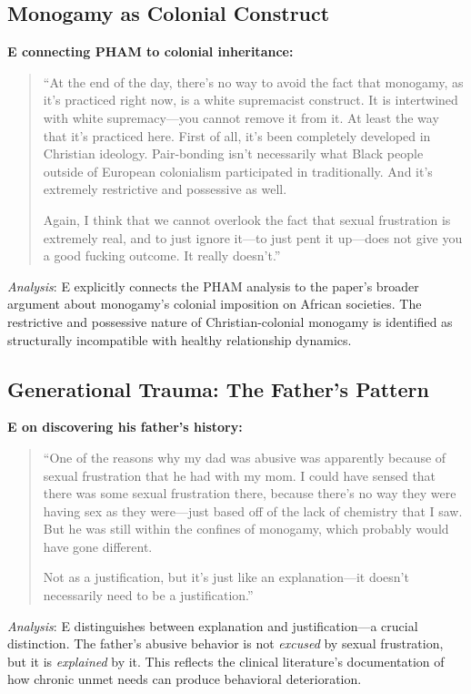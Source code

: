 \documentclass[12pt,openany]{book}
\numberwithin{equation}{chapter}
\begin{document}
\subsection{Monogamy as Colonial Construct}

\textbf{E connecting PHAM to colonial inheritance:}
\begin{quote}
``At the end of the day, there's no way to avoid the fact that monogamy, as it's practiced right now, is a white supremacist construct. It is intertwined with white supremacy---you cannot remove it from it. At least the way that it's practiced here. First of all, it's been completely developed in Christian ideology. Pair-bonding isn't necessarily what Black people outside of European colonialism participated in traditionally. And it's extremely restrictive and possessive as well.

Again, I think that we cannot overlook the fact that sexual frustration is extremely real, and to just ignore it---to just pent it up---does not give you a good fucking outcome. It really doesn't.''
\end{quote}

\textit{Analysis}: E explicitly connects the PHAM analysis to the paper's broader argument about monogamy's colonial imposition on African societies. The restrictive and possessive nature of Christian-colonial monogamy is identified as structurally incompatible with healthy relationship dynamics.

\subsection{Generational Trauma: The Father's Pattern}

\textbf{E on discovering his father's history:}
\begin{quote}
``One of the reasons why my dad was abusive was apparently because of sexual frustration that he had with my mom. I could have sensed that there was some sexual frustration there, because there's no way they were having sex as they were---just based off of the lack of chemistry that I saw. But he was still within the confines of monogamy, which probably would have gone different.

Not as a justification, but it's just like an explanation---it doesn't necessarily need to be a justification.''
\end{quote}

\textit{Analysis}: E distinguishes between explanation and justification---a crucial distinction. The father's abusive behavior is not \textit{excused} by sexual frustration, but it is \textit{explained} by it. This reflects the clinical literature's documentation of how chronic unmet needs can produce behavioral deterioration.
\end{document}
